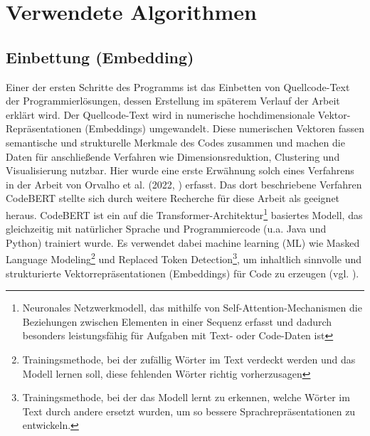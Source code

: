 \section{Verwendete Algorithmen}

\subsection{Einbettung (Embedding)}
Einer der ersten Schritte des Programms ist das Einbetten von Quellcode-Text der Programmierlösungen, dessen Erstellung im späterem Verlauf der Arbeit erklärt wird. Der Quellcode-Text wird in numerische hochdimensionale Vektor-Repräsentationen (Embeddings) umgewandelt. Diese numerischen Vektoren fassen semantische und strukturelle Merkmale des Codes zusammen und machen die Daten für anschließende Verfahren wie Dimensionsreduktion, Clustering und Visualisierung nutzbar. Hier wurde eine erste Erwähnung solch eines Verfahrens in der Arbeit von Orvalho et al. (2022, \cite{Orvalho.28.06.2022}) erfasst. Das dort beschriebene Verfahren CodeBERT stellte sich durch weitere Recherche für diese Arbeit als geeignet heraus. CodeBERT ist ein auf die Transformer-Architektur\footnote{Neuronales Netzwerkmodell, das mithilfe von Self-Attention-Mechanismen die Beziehungen zwischen Elementen in einer Sequenz erfasst und dadurch besonders leistungsfähig für Aufgaben mit Text- oder Code-Daten ist} basiertes Modell, das gleichzeitig mit natürlicher Sprache und Programmiercode (u.a. Java und Python) trainiert wurde. Es verwendet dabei machine learning (ML) wie Masked Language Modeling\footnote{Trainingsmethode, bei der zufällig Wörter im Text verdeckt werden und das Modell lernen soll, diese fehlenden Wörter richtig vorherzusagen} und Replaced Token Detection\footnote{Trainingsmethode, bei der das Modell lernt zu erkennen, welche Wörter im Text durch andere ersetzt wurden, um so bessere Sprachrepräsentationen zu entwickeln.}, um inhaltlich sinnvolle und strukturierte Vektorrepräsentationen (Embeddings) für Code zu erzeugen (vgl. \cite{Feng.19.02.2020}).

